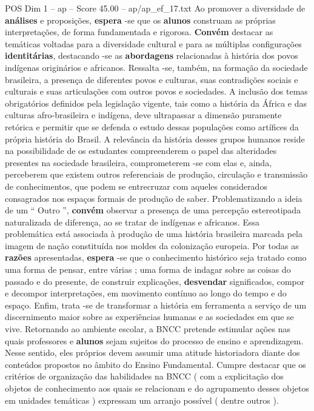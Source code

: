 \begin{textsample}{POS Dim 1 – ap – Score 45.00 – ap/ap\_ef\_17.txt}
Ao promover a diversidade de \textbf{análises} e proposições, \textbf{espera} -se que os \textbf{alunos} construam as próprias interpretações, de forma fundamentada e rigorosa. \textbf{Convém} destacar as temáticas voltadas para a diversidade cultural e para as múltiplas configurações \textbf{identitárias}, destacando -se as \textbf{abordagens} relacionadas à história dos povos indígenas originários e africanos.
Ressalta -se, também, na formação da sociedade brasileira, a presença de diferentes povos e culturas, suas contradições sociais e culturais e suas articulações com outros povos e sociedades.
A inclusão dos temas obrigatórios definidos pela legislação vigente, tais como a história da África e das culturas afro-brasileira e indígena, deve ultrapassar a dimensão puramente retórica e permitir que se defenda o estudo dessas populações como artífices da própria história do Brasil.
A relevância da história desses grupos humanos reside na possibilidade de os estudantes compreenderem o papel das alteridades presentes na sociedade brasileira, comprometerem -se com elas e, ainda, perceberem que existem outros referenciais de produção, circulação e transmissão de conhecimentos, que podem se entrecruzar com aqueles considerados consagrados nos espaços formais de produção de saber.
Problematizando a ideia de um “ Outro ”, \textbf{convém} observar a presença de uma percepção estereotipada naturalizada de diferença, ao se tratar de indígenas e africanos.
Essa problemática está associada à produção de uma história brasileira marcada pela imagem de nação constituída nos moldes da colonização europeia.
Por todas as \textbf{razões} apresentadas, \textbf{espera} -se que o conhecimento histórico seja tratado como uma forma de pensar, entre várias ; uma forma de indagar sobre as coisas do passado e do presente, de construir explicações, \textbf{desvendar} significados, compor e decompor interpretações, em movimento contínuo ao longo do tempo e do espaço.
Enfim, trata -se de transformar a história em ferramenta a serviço de um discernimento maior sobre as experiências humanas e as sociedades em que se vive.
Retornando ao ambiente escolar, a BNCC pretende estimular ações nas quais professores e \textbf{alunos} sejam sujeitos do processo de ensino e aprendizagem.
Nesse sentido, eles próprios devem assumir uma atitude historiadora diante dos conteúdos propostos no âmbito do Ensino Fundamental.
Cumpre destacar que os critérios de organização das habilidades na BNCC ( com a explicitação dos objetos de conhecimento aos quais se relacionam e do agrupamento desses objetos em unidades temáticas ) expressam um arranjo possível ( dentre outros ).

\end{textsample}
